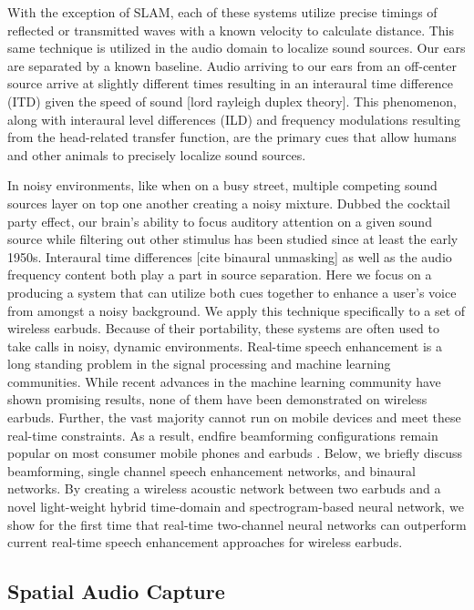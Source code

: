 \documentclass [11pt, proquest] {uwthesis}[2020/02/24]
\begin{document}
With the exception of SLAM, each of these systems utilize precise timings of reflected or transmitted waves with a known velocity to calculate distance. This same technique is utilized in the audio domain to localize sound sources. Our ears are separated by a known baseline. Audio arriving to our ears from an off-center source arrive at slightly different times resulting in an interaural time difference (ITD) given the speed of sound [lord rayleigh duplex theory]. This phenomenon, along with interaural level differences (ILD) and frequency modulations resulting from the head-related transfer function, are the primary cues that allow humans and other animals to precisely localize sound sources.

In noisy environments, like when on a busy street, multiple competing sound sources layer on top one another creating a noisy mixture. Dubbed the cocktail party effect, our brain's ability to focus auditory attention on a given sound source while filtering out other stimulus has been studied since at least the early 1950s. Interaural time differences [cite binaural unmasking] as well as the audio frequency content both play a part in source separation. Here we focus on a producing a system that can utilize both cues together to enhance a user's voice from amongst a noisy background. We apply this technique specifically to a set of wireless earbuds. Because of their portability, these systems are often used to take calls in noisy, dynamic environments. Real-time speech enhancement is a long standing problem in the signal processing and machine learning communities.  While recent advances in the machine learning community have shown promising results, none of them have been demonstrated on wireless earbuds. Further, the vast majority cannot run on mobile devices and meet these real-time constraints. As a result, endfire beamforming configurations remain popular on most consumer mobile phones and earbuds \cite{samsungglobalnewsroom_2014, airpods, sennheiser_2020, beamforming-app-note}. Below, we briefly discuss beamforming, single channel speech enhancement networks, and binaural networks. By creating a wireless acoustic  network between two earbuds and a novel light-weight hybrid  time-domain and spectrogram-based  neural network, we show for the first time that real-time two-channel neural networks can outperform  current real-time speech enhancement approaches for wireless earbuds.

\subsection{Spatial Audio Capture}
\end{document}
